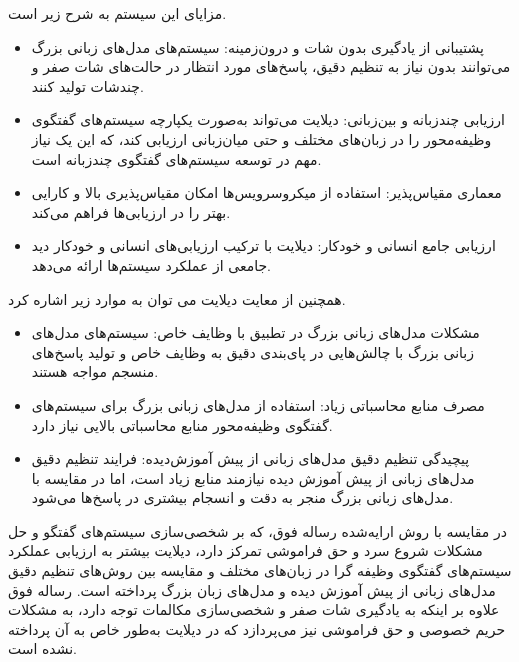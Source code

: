 \begin{enumerate}
 مزایای این سیستم به شرح زیر است.
\begin{itemize}
\item
پشتیبانی از یادگیری بدون شات و درون‌زمینه: سیستم‌های مدل‌های زبانی بزرگ می‌توانند بدون نیاز به تنظیم دقیق، پاسخ‌های مورد انتظار در حالت‌های شات صفر و چندشات تولید کنند.
\item
ارزیابی چندزبانه و بین‌زبانی: دیلایت می‌تواند به‌صورت یکپارچه سیستم‌های گفتگوی وظیفه‌محور را در زبان‌های مختلف و حتی میان‌زبانی ارزیابی کند، که این یک نیاز مهم در توسعه سیستم‌های گفتگوی چندزبانه است.
\item
معماری مقیاس‌پذیر: استفاده از میکروسرویس‌ها امکان مقیاس‌پذیری بالا و کارایی بهتر را در ارزیابی‌ها فراهم می‌کند.
\item
ارزیابی جامع انسانی و خودکار: دیلایت با ترکیب ارزیابی‌های انسانی و خودکار دید جامعی از عملکرد سیستم‌ها ارائه می‌دهد.
\end{itemize}

همچنین از معایت دیلایت می توان به موارد زیر اشاره کرد.
\begin{itemize}
\item
مشکلات مدل‌های زبانی بزرگ در تطبیق با وظایف خاص: سیستم‌های مدل‌های زبانی بزرگ با چالش‌هایی در پای‌بندی دقیق به وظایف خاص و تولید پاسخ‌های منسجم مواجه هستند.
\item
مصرف منابع محاسباتی زیاد: استفاده از مدل‌های زبانی بزرگ برای سیستم‌های گفتگوی وظیفه‌محور منابع محاسباتی بالایی نیاز دارد.
\item
پیچیدگی تنظیم دقیق مدل‌های زبانی از پیش آموزش‌دیده: فرایند تنظیم دقیق مدل‌های زبانی از پیش آموزش دیده نیازمند منابع زیاد است، اما در مقایسه با مدل‌های زبانی بزرگ منجر به دقت و انسجام بیشتری در پاسخ‌ها می‌شود.
\end{itemize}

در مقایسه با روش ارایه‌شده رساله فوق، که بر شخصی‌سازی سیستم‌های گفتگو و حل مشکلات شروع سرد و حق فراموشی تمرکز دارد، دیلایت بیشتر به ارزیابی عملکرد سیستم‌های گفتگوی وظیفه گرا در زبان‌های مختلف و مقایسه بین روش‌های تنظیم دقیق مدل‌های زبانی از پیش آموزش دیده و مدل‌های زبان بزرگ پرداخته است. رساله فوق علاوه بر اینکه به یادگیری شات صفر و شخصی‌سازی مکالمات توجه دارد، به مشکلات حریم خصوصی و حق فراموشی نیز می‌پردازد که در دیلایت به‌طور خاص به آن پرداخته نشده است. \\


\end{enumerate}
